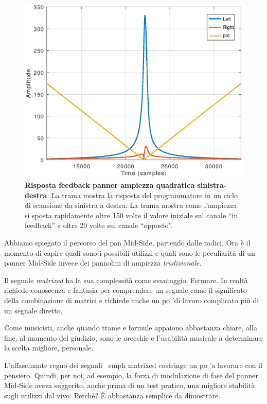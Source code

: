 \begin{figure}[t]
\centering
\includegraphics[width=1\columnwidth]{CAPITOLI/1000/IMG/lrpanfbpot2}
\caption{\textbf{Risposta feedback panner ampiezza quadratica sinistra-destra}.
La trama mostra la risposta del programmatore in un ciclo di scansione da
sinistra a destra. La trama mostra come l'ampiezza si sposta rapidamente oltre
150 volte il valore iniziale sul canale “in feedback” e oltre 20 volte sul
canale “opposto”.}
\label{fig:lrpanfb2}
\end{figure}

Abbiamo spiegato il percorso del pan Mid-Side, partendo dalle radici. Ora è il
momento di capire quali sono i possibili utilizzi e quali sono le peculiarità di
un panner Mid-Side invece dei pannolini di ampiezza \emph{tradizionale}.

Il segnale \emph{matrixed} ha la sua complessità come svantaggio. Fermare. In
realtà richiede conoscenza e fantasia per comprendere un segnale come il
significato della combinazione di matrici e richiede anche un po 'di lavoro
complicato più di un segnale diretto.

Come musicisti, anche quando trame e formule appaiono abbastanza chiare, alla
fine, al momento del giudizio, sono le orecchie e l'usabilità musicale a
determinare la scelta migliore, personale.

L'affascinante regno dei segnali \ emph {matrixed} costringe un po 'a lavorare
con il pensiero. Quindi, per noi, ad esempio, la forza di modulazione di fase
del panner Mid-Side aveva suggerito, anche prima di un test pratico, una
migliore stabilità sugli utilizzi dal vivo. Perché? È abbastanza semplice da
dimostrare.

